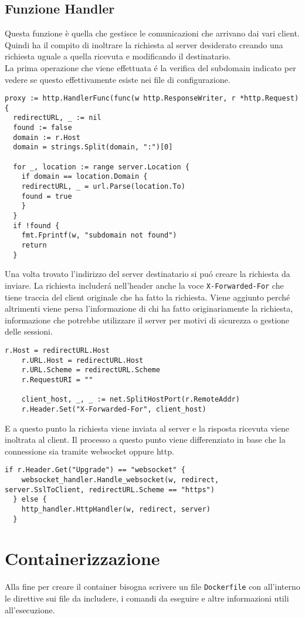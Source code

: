 \subsection{Funzione Handler}
Questa funzione è quella che gestisce le comunicazioni che arrivano dai vari client. Quindi ha il compito di inoltrare la richiesta al server desiderato creando una richiesta uguale a quella ricevuta e modificando il destinatario.\\La prima operazione che viene effettuata é la verifica del subdomain indicato per vedere se questo effettivamente esiste nei file di configurazione.
\begin{lstlisting}[language=Golang]
proxy := http.HandlerFunc(func(w http.ResponseWriter, r *http.Request) {
  redirectURL, _ := nil
  found := false
  domain := r.Host
  domain = strings.Split(domain, ":")[0]

  for _, location := range server.Location {
	if domain == location.Domain {
  	redirectURL, _ = url.Parse(location.To)
  	found = true
	}
  }
  if !found {
	fmt.Fprintf(w, "subdomain not found")
	return
  }
\end{lstlisting}
Una volta trovato l'indirizzo del server destinatario si puó creare la richiesta da inviare. La richiesta includerá nell'header anche la voce \texttt{X-Forwarded-For} che tiene traccia del client originale che ha fatto la richiesta. Viene aggiunto perché altrimenti viene persa l'informazione di chi ha fatto originariamente la richiesta, informazione che potrebbe utilizzare il server per motivi di sicurezza o gestione delle sessioni.
\begin{lstlisting}[language=Golang]
	r.Host = redirectURL.Host
	r.URL.Host = redirectURL.Host
	r.URL.Scheme = redirectURL.Scheme
	r.RequestURI = ""

	client_host, _, _ := net.SplitHostPort(r.RemoteAddr)
	r.Header.Set("X-Forwarded-For", client_host)
\end{lstlisting}
E a questo punto la richiesta viene inviata al server e la risposta ricevuta viene inoltrata al client. Il processo a questo punto viene differenziato in base che la connessione sia tramite websocket oppure http.
\begin{lstlisting}[language=Golang]
  if r.Header.Get("Upgrade") == "websocket" {
	websocket_handler.Handle_websocket(w, redirect, server.SslToClient, redirectURL.Scheme == "https")
  } else {
	http_handler.HttpHandler(w, redirect, server)
  }
\end{lstlisting}


\section{Containerizzazione}
Alla fine per creare il container bisogna scrivere un file \texttt{Dockerfile} con all'interno le direttive sui file da includere, i comandi da eseguire e altre informazioni utili all'esecuzione.
